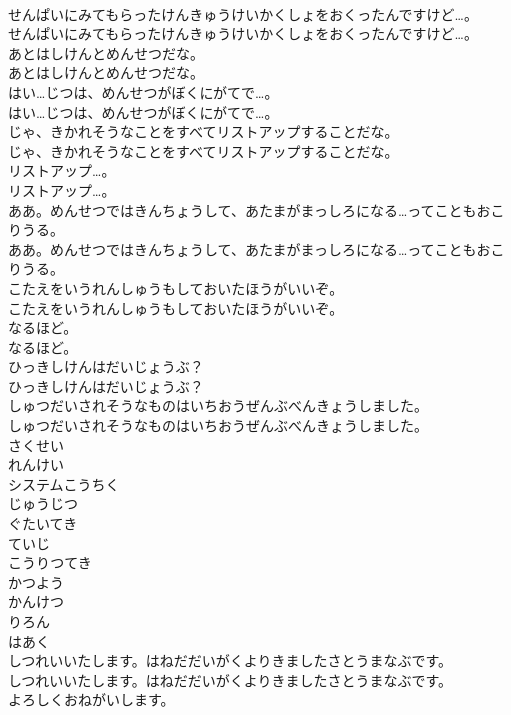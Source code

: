 \documentclass[8pt]{extreport}
\begin{document}
\begin{CJK}{UTF8}{min}
\\	せんぱいにみてもらったけんきゅうけいかくしょをおくったんですけど…。
\\	せんぱいにみてもらったけんきゅうけいかくしょをおくったんですけど…。
\\	あとはしけんとめんせつだな。
\\	あとはしけんとめんせつだな。
\\	はい…じつは、めんせつがぼくにがてで…。
\\	はい…じつは、めんせつがぼくにがてで…。
\\	じゃ、きかれそうなことをすべてリストアップすることだな。
\\	じゃ、きかれそうなことをすべてリストアップすることだな。
\\	リストアップ…。
\\	リストアップ…。
\\	ああ。めんせつではきんちょうして、あたまがまっしろになる…ってこともおこりうる。
\\	ああ。めんせつではきんちょうして、あたまがまっしろになる…ってこともおこりうる。
\\	こたえをいうれんしゅうもしておいたほうがいいぞ。
\\	こたえをいうれんしゅうもしておいたほうがいいぞ。
\\	なるほど。
\\	なるほど。
\\	ひっきしけんはだいじょうぶ？
\\	ひっきしけんはだいじょうぶ？
\\	しゅつだいされそうなものはいちおうぜんぶべんきょうしました。
\\	しゅつだいされそうなものはいちおうぜんぶべんきょうしました。
\\	さくせい
\\	れんけい
\\	システムこうちく
\\	じゅうじつ
\\	ぐたいてき
\\	ていじ
\\	こうりつてき
\\	かつよう
\\	かんけつ
\\	りろん
\\	はあく
\\	しつれいいたします。はねだだいがくよりきましたさとうまなぶです。
\\	しつれいいたします。はねだだいがくよりきましたさとうまなぶです。
\\	よろしくおねがいします。

\end{CJK}
\end{document}
